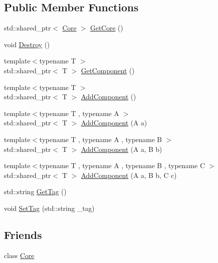 \subsection*{Public Member Functions}
\begin{DoxyCompactItemize}
\item 
std\+::shared\+\_\+ptr$<$ \mbox{\hyperlink{class_core}{Core}} $>$ \mbox{\hyperlink{class_entity_aca8a5ff6e980db6f834d841a73dfbf89}{Get\+Core}} ()
\item 
void \mbox{\hyperlink{class_entity_aa75151fc607686b42d27f8c3ba73143d}{Destroy}} ()
\item 
{\footnotesize template$<$typename T $>$ }\\std\+::shared\+\_\+ptr$<$ T $>$ \mbox{\hyperlink{class_entity_ad5cf8774322cc838147e43866a475546}{Get\+Component}} ()
\item 
{\footnotesize template$<$typename T $>$ }\\std\+::shared\+\_\+ptr$<$ T $>$ \mbox{\hyperlink{class_entity_ad81bdf8285a9da23658d48dd5aaebb03}{Add\+Component}} ()
\item 
{\footnotesize template$<$typename T , typename A $>$ }\\std\+::shared\+\_\+ptr$<$ T $>$ \mbox{\hyperlink{class_entity_a9479c2ee06931b01c9b9012191de8dc7}{Add\+Component}} (A a)
\item 
{\footnotesize template$<$typename T , typename A , typename B $>$ }\\std\+::shared\+\_\+ptr$<$ T $>$ \mbox{\hyperlink{class_entity_aa07de6a1691dc07198feb401e273139e}{Add\+Component}} (A a, B b)
\item 
{\footnotesize template$<$typename T , typename A , typename B , typename C $>$ }\\std\+::shared\+\_\+ptr$<$ T $>$ \mbox{\hyperlink{class_entity_abe12552792daa14156ade47eb8db1933}{Add\+Component}} (A a, B b, C c)
\item 
std\+::string \mbox{\hyperlink{class_entity_a75b54507da9a1178db1f742cc49fcba1}{Get\+Tag}} ()
\item 
void \mbox{\hyperlink{class_entity_ac5da9f659ddd64da2c4c18ee6346d320}{Set\+Tag}} (std\+::string \+\_\+tag)
\end{DoxyCompactItemize}
\subsection*{Friends}
\begin{DoxyCompactItemize}
\item 
class \mbox{\hyperlink{class_entity_a4107254ac74f90d4f91e810d755b98c2}{Core}}
\end{DoxyCompactItemize}


